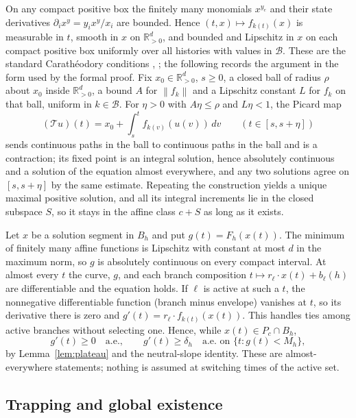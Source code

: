 \documentclass[11pt]{article}
\theoremstyle{definition}
\theoremstyle{remark}
\newcommand{\R}{\mathbb R}
\newcommand{\U}{\R_{>0}^{d}}
\newcommand{\B}{\mathcal B}
\newcommand{\norm}[1]{\left\|#1\right\|}
\begin{document}
On any compact positive box the finitely many monomials $x^{y_e}$ and their state
derivatives $\partial_i x^{y}=y_ix^{y}/x_i$ are bounded. Hence
$(t,x)\mapsto f_{k(t)}(x)$ is measurable in $t$, smooth in $x$ on $\U$, and bounded
and Lipschitz in $x$ on each compact positive box uniformly over all histories
with values in $\B$. These are the standard Carath\'eodory conditions
\cite[Chapter~2]{CoddingtonLevinson1955}, \cite[\S1]{Filippov1988}; the following records the
argument in the form used by the formal proof. Fix $x_0\in\U$, $s\ge0$, a closed
ball of radius $\rho$ about $x_0$ inside $\U$, a bound $A$ for $\norm{f_k}$ and a
Lipschitz constant $L$ for $f_k$ on that ball, uniform in $k\in\B$. For $\eta>0$
with $A\eta\le\rho$ and $L\eta<1$, the Picard map
\[
 (\mathcal Tu)(t)=x_0+\int_s^t f_{k(v)}(u(v))\,dv\qquad(t\in[s,s+\eta])
\]
sends continuous paths in the ball to continuous paths in the ball and is a
contraction; its fixed point is an integral solution, hence absolutely continuous
and a solution of the equation almost everywhere, and any two solutions agree on
$[s,s+\eta]$ by the same estimate. Repeating the construction yields a unique
maximal positive solution, and all its integral increments lie in the closed
subspace $S$, so it stays in the affine class $c+S$ as long as it exists.

Let $x$ be a solution segment in $B_h$ and put $g(t)=F_h(x(t))$. The minimum of
finitely many affine functions is Lipschitz with constant at most $d$ in the
maximum norm, so $g$ is absolutely continuous on every compact interval. At almost
every $t$ the curve, $g$, and each branch composition $t\mapsto r_\ell\cdot x(t)+b_\ell(h)$
are differentiable and the equation holds. If $\ell$ is active at such a $t$, the
nonnegative differentiable function (branch minus envelope) vanishes at $t$, so
its derivative there is zero and $g'(t)=r_\ell\cdot f_{k(t)}(x(t))$. This handles
ties among active branches without selecting one. Hence, while $x(t)\in P_c\cap B_h$,
\begin{equation}\label{eq:acdrift}
 g'(t)\ge0\quad\text{a.e.},\qquad g'(t)\ge\delta_h\quad\text{a.e. on }\{t:g(t)<M_h\},
\end{equation}
by Lemma~\ref{lem:plateau} and the neutral-slope identity. These are
almost-everywhere statements; nothing is assumed at switching times of the
active set.

\subsection{Trapping and global existence}\label{sec:trapping}
\end{document}
